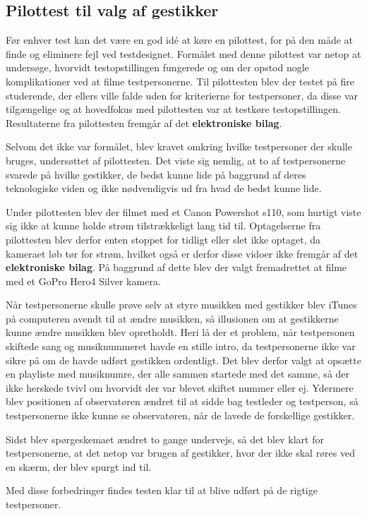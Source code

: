 \subsection{Pilottest til valg af gestikker}
\label{PilottestValgAfGestikker}
Før enhver test kan det være en god idé at køre en pilottest, for på den måde at finde og eliminere fejl ved testdesignet. Formålet med denne pilottest var netop at undersøge, hvorvidt testopstillingen fungerede og om der opstod nogle komplikationer ved at filme testpersonerne. Til pilottesten blev der testet på fire studerende, der ellers ville falde uden for kriterierne for testpersoner, da disse var tilgængelige og at hovedfokus med pilottesten var at testkøre testopstillingen. Resultaterne fra pilottesten fremgår af det \textbf{elektroniske bilag}. 

Selvom det ikke var formålet, blev kravet omkring hvilke testpersoner der skulle bruges, undersøttet af pilottesten. Det viste sig nemlig, at to af testpersonerne svarede på hvilke gestikker, de bedst kunne lide på baggrund af deres teknologiske viden og ikke nødvendigvis ud fra hvad de bedst kunne lide. 

Under pilottesten blev der filmet med et Canon Powershot s110, som hurtigt viste sig ikke at kunne holde strøm tilstrækkeligt lang tid til. Optagelserne fra pilottesten blev derfor enten stoppet for tidligt eller slet ikke optaget, da kameraet løb tør for strøm, hvilket også er derfor disse vidoer ikke fremgår af det \textbf{elektroniske bilag}. På baggrund af dette blev der valgt fremadrettet at filme med et GoPro Hero4 Silver kamera. 

Når testpersonerne skulle prøve selv at styre musikken med gestikker blev iTunes på computeren avendt til at ændre musikken, så illusionen om at gestikkerne kunne ændre musikken blev opretholdt. Heri lå der et problem, når testpersonen skiftede sang og musiknummeret havde en stille intro, da testpersonerne ikke var sikre på om de havde udført gestikken ordentligt. Det blev derfor valgt at opsætte en playliste med musiknumre, der alle sammen startede med det samme, så der ikke herskede tvivl om hvorvidt der var blevet skiftet nummer eller ej. Ydermere blev positionen af observatøren ændret til at sidde bag testleder og testperson, så testpersonerne ikke kunne se observatøren, når de lavede de forskellige gestikker. 

Sidst blev spørgeskemaet ændret to gange undervejs, så det blev klart for testpersonerne, at det netop var brugen af gestikker, hvor der ikke skal røres ved en skærm, der blev spurgt ind til. 

Med disse forbedringer findes testen klar til at blive udført på de rigtige testpersoner. 